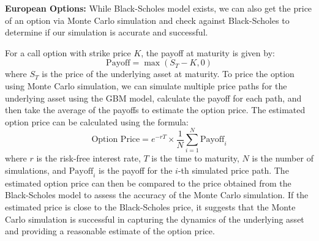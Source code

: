 \textbf{European Options:} While Black-Scholes model exists, we can also get the price
of an option via Monte Carlo simulation and check against Black-Scholes to
determine if our simulation is accurate and successful.

For a call option with strike price $K$, the payoff at maturity is given by:
$$\text{Payoff} = \max(S_T - K, 0)$$ where $S_T$ is the price of the underlying
asset at maturity. To price the option using Monte Carlo simulation, we can
simulate multiple price paths for the underlying asset using the GBM model,
calculate the payoff for each path, and then take the average of the payoffs to
estimate the option price. The estimated option price can be calculated using
the formula: $$\text{Option Price} = e^{-rT} \times \frac{1}{N} \sum_{i=1}^{N}
    \text{Payoff}_i$$ where $r$ is the risk-free interest rate, $T$ is the time to
maturity, $N$ is the number of simulations, and $\text{Payoff}_i$ is the payoff
for the $i$-th simulated price path. The estimated option price can then be
compared to the price obtained from the Black-Scholes model to assess the
accuracy of the Monte Carlo simulation. If the estimated price is close to the
Black-Scholes price, it suggests that the Monte Carlo simulation is successful
in capturing the dynamics of the underlying asset and providing a reasonable
estimate of the option price.